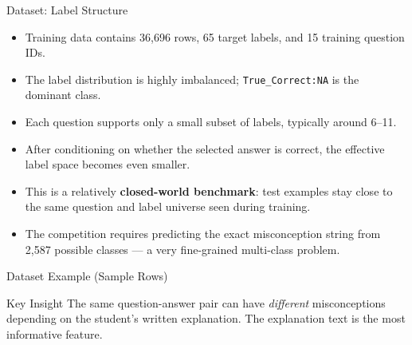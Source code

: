 \documentclass[aspectratio=169]{beamer}
\begin{document}
\begin{frame}{Dataset: Label Structure}
\begin{itemize}
  \item Training data contains 36,696 rows, 65 target labels, and 15 training question IDs.
  \item The label distribution is highly imbalanced; \texttt{True\_Correct:NA} is the dominant class.
  \item Each question supports only a small subset of labels, typically around 6--11.
  \item After conditioning on whether the selected answer is correct, the effective label space becomes even smaller.
  \item This is a relatively \textbf{closed-world benchmark}: test examples stay close to the same question and label universe seen during training.
  \item The competition requires predicting the exact misconception string from 2,587 possible classes --- a very fine-grained multi-class problem.
\end{itemize}
\end{frame}

\begin{frame}{Dataset Example (Sample Rows)}
\scriptsize
\setlength{\tabcolsep}{3pt}
\renewcommand{\arraystretch}{1.15}
\begin{table}
\centering
{}
\caption{Example records showing question text, selected answer, explanation, category, and misconception label.}
\end{table}
\vspace{-4pt}
\begin{exampleblock}{Key Insight}
The same question-answer pair can have \textit{different} misconceptions depending on the student's written explanation. The explanation text is the most informative feature.
\end{exampleblock}
\end{frame}
\end{document}
